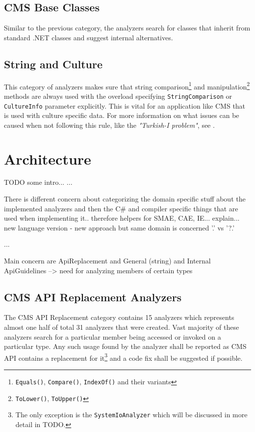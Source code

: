 \documentclass[
  digital, %
  table,   %
  lof,     %
  lot,     %
  oneside,
]{fithesis3}
\begin{document}
\subsection{CMS Base Classes}
Similar to the previous category, the analyzers search for classes that inherit from standard .NET classes and suggest internal alternatives.

\subsection{String and Culture}
This category of analyzers makes sure that string comparison\footnote{\texttt{Equals()}, \texttt{Compare()}, \texttt{IndexOf()} and their variants} and manipulation\footnote{\texttt{ToLower()}, \texttt{ToUpper()}} methods are always used with the overload specifying \texttt{StringComparison} or \texttt{CultureInfo} parameter explicitly. This is vital for an application like CMS that is used with culture specific data. For more information on what issues can be caused when not following this rule, like the \textit{"Turkish-I problem"}, see \cite{best-practices-for-using-strings-in-dot-net}. 

\section{Architecture}
TODO some intro...
...

There is different concern about categorizing the domain specific stuff about the implemented analyzers and then the C\# and compiler specific things that are used when implementing it.. therefore helpers for SMAE, CAE, IE... explain... new language version - new approach but same domain is concerned '.' vs '?.'

...

Main concern are ApiReplacement and General (string) and Internal ApiGuidelines --> need for analyzing members of certain types

\subsection{CMS API Replacement Analyzers}
The CMS API Replacement category contains 15 analyzers which represents almost one half of total 31 analyzers that were created. Vast majority of these analyzers search for a particular member being accessed or invoked on a particular type. Any such usage found by the analyzer shall be reported as CMS API contains a replacement for it\footnote{The only exception is the \texttt{SystemIoAnalyzer} which will be discussed in more detail in TODO.} and a code fix shall be suggested if possible.
\end{document}
